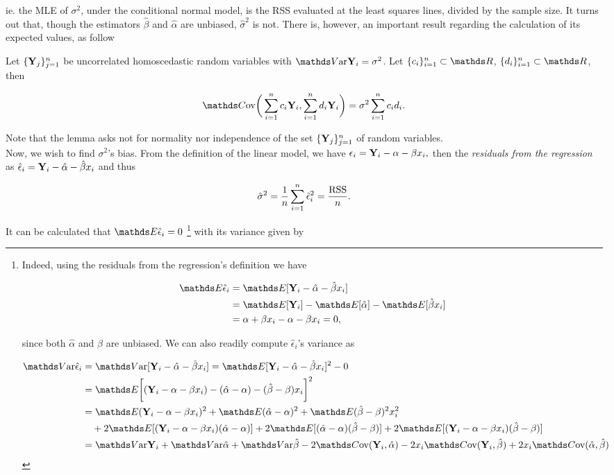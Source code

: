 \documentclass{homework}
\begin{document}
ie. the MLE of $\sigma^2$, under the conditional normal model, is the RSS evaluated at the least squares lines, divided by the sample size. It turns out that, though the estimators $\hat{\beta}$ and $\hat{\alpha}$ are unbiased, $\hat{\sigma}^2$ is not. There is, however, an important result regarding the calculation of its expected values, as follow

\begin{lemma}
Let $\{{\bf Y}_j\}_{j=1}^{n}$ be uncorrelated homoscedastic random variables with $\var \Y_i = \sigma^2$. Let $\{c_i\}_{i=1}^{n} \subset \R$, $\{d_i\}_{i=1}^{n} \subset \R$, then

$$
\cov\bigg(\sum_{i=1}^{n} c_i \Y_i, \sum_{i=1}^{n} d_i \Y_i\bigg) = \sigma^2 \sum_{i=1}^{n} c_i d_i.
$$
\end{lemma}

Note that the lemma asks not for normality nor independence of the set $\{{\bf Y}_j\}_{j=1}^{n}$ of random variables. \\

Now, we wish to find $\sigma^2$'s bias. From the definition of the linear model, we have $
\epsilon_i = {\bf Y}_i - \alpha - \beta x_i, $ then the \textit{residuals from the regression} as 
$\hat \epsilon_i = {\bf Y}_i - \hat \alpha - \hat \beta x_i$
and thus 

$$
\hat{\sigma}^2 = \frac{1}{n} \sum_{i=1}^{n} \hat{\epsilon}_i^2 = \frac{\textnormal{RSS}}{n}.
$$

It can be calculated that $\E \hat{\epsilon}_i = 0$ \footnote{Indeed, using the residuals from the regression's definition we have 

\begin{align*}
    \E \hat{\epsilon}_i &= \E[\Y_i - \hat \alpha - \hat \beta x_i] \\
    &= \E[\Y_i] - \E[\hat \alpha] - \E[\hat \beta x_i] \\
    &= \alpha + \beta x_i - \alpha - \beta x_i = 0,
\end{align*}

since both $\hat{\alpha}$ and $\hat{\beta}$ are unbiased. We can also readily compute $\hat{\epsilon}_i$'s variance as

\begin{align*}
    \var \hat \epsilon_i &= \var[\Y_i - \hat \alpha - \hat \beta x_i] = \E[\Y_i - \hat \alpha - \hat \beta x_i]^2 - 0 \\
    &= \E\bigg[(\Y_i - \alpha - \beta x_i) - (\hat \alpha - \alpha) - (\hat \beta - \beta) x_i \bigg]^2 \\
    &= \E(\Y_i - \alpha - \beta x_i)^2  + \E(\hat \alpha - \alpha)^2 + \E(\hat \beta - \beta)^2 x_i^2 \\ 
    & \blank \blank \blank + 2\E[(\Y_i - \alpha - \beta x_i) (\hat \alpha - \alpha)] + 2\E[(\hat \alpha - \alpha)(\hat \beta -  \beta)] + 2 \E[(\Y_i - \alpha - \beta x_i)(\hat \beta -  \beta)] \\
    &= \var \Y_i + \var \hat \alpha + \var \hat \beta - 2\cov (\Y_i, \hat \alpha) - 2x_i \cov(\Y_i, \hat \beta) + 2x_i \cov(\hat \alpha, \hat \beta) 
\end{align*}
}
with its variance given by 
\end{document}
